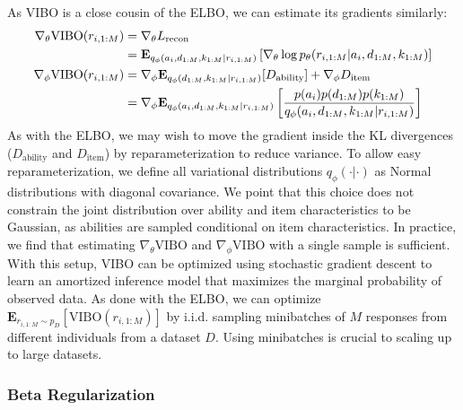 As VIBO is a close cousin of the ELBO, we can estimate its gradients similarly:
\begin{align*}
    \nabla_\theta \textup{VIBO}({r}_{i,1:M}) &= \nabla_\theta L_{\text{recon}} \\
    &= \mathbf{E}_{q_\phi({a}_i, {d}_{1:M}, k_{1:M}|{r}_{i,1:M})}\left[ \nabla_\theta \log p_\theta({r}_{i,1:M}|{a}_i, {d}_{1:M}, k_{1:M}) \right] \\
    \nabla_\phi \textup{VIBO}({r}_{i,1:M}) &= \nabla_\phi \mathbf{E}_{q_\phi({d}_{1:M}, k_{1:M}|{r}_{i,1:M})}[D_{\text{ability}}] + \nabla_\phi D_{\text{item}} \\
    &= \nabla_\phi \mathbf{E}_{q_\phi({a}_i,{d}_{1:M}, k_{1:M}|{r}_{i,1:M})}\left[\frac{p({a}_i)p({d}_{1:M})p(k_{1:M})}{q_\phi({a}_i,{d}_{1:M}, k_{1:M}|{r}_{i,1:M})}\right]
\end{align*}
As with the ELBO, we may wish to move the gradient inside the \textup{KL} divergences ($D_{\text{ability}}$ and $D_{\text{item}}$) by reparameterization to reduce variance.
To allow easy reparameterization, we define all variational distributions $q_\phi(\cdot|\cdot)$ as Normal distributions with diagonal covariance. 
We point that this choice does not constrain the joint distribution over ability and item characteristics to be Gaussian, as abilities are sampled conditional on item characteristics.
In practice, we find that estimating $\nabla_\theta \text{VIBO}$ and $\nabla_\phi \text{VIBO}$ with a single sample is sufficient.
With this setup, VIBO can be optimized using stochastic gradient descent to learn an amortized inference model that maximizes the marginal probability of observed data.
As done with the ELBO, we can optimize $\mathbf{E}_{{r}_{i,1:M} \sim p_{D}}\left[\text{VIBO}({r}_{i,1:M})\right]$ by i.i.d. sampling minibatches of $M$ responses from different individuals from a dataset $D$.
Using minibatches is crucial to scaling up to large datasets.

\subsubsection{Beta Regularization}

